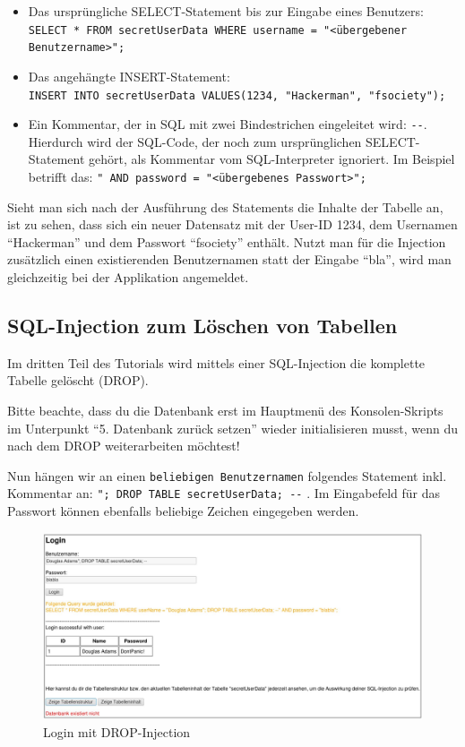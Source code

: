 \begin{itemize}
	\item Das ursprüngliche SELECT-Statement bis zur Eingabe eines Benutzers:  \colorbox{altgray}{\lstinline|SELECT * FROM secretUserData WHERE username = "<übergebener Benutzername>";|}
	\item Das angehängte INSERT-Statement:\\ \colorbox{altgray}{\lstinline|INSERT INTO secretUserData VALUES(1234, "Hackerman", "fsociety");|}
	\item Ein Kommentar, der in SQL mit zwei Bindestrichen eingeleitet wird: \colorbox{altgray}{\lstinline|--|}. Hierdurch wird der SQL-Code, der noch zum ursprünglichen SELECT-Statement gehört, als Kommentar vom SQL-Interpreter ignoriert. Im Beispiel betrifft das: \colorbox{altgray}{\lstinline|" AND password = "<übergebenes Passwort>";|}
\end{itemize}

Sieht man sich nach der Ausführung des Statements die Inhalte der Tabelle an, ist zu sehen, dass sich ein neuer Datensatz mit der User-ID 1234, dem Usernamen \enquote{Hackerman} und dem Passwort \enquote{fsociety} enthält. Nutzt man für die Injection zusätzlich einen existierenden Benutzernamen statt der Eingabe \enquote{bla}, wird man gleichzeitig bei der Applikation angemeldet.

\subsection{SQL-Injection zum Löschen von Tabellen}
Im dritten Teil des Tutorials wird mittels einer SQL-Injection die komplette Tabelle gelöscht (DROP).
 
Bitte beachte, dass du die Datenbank erst im Hauptmenü des Konsolen-Skripts im Unterpunkt \enquote{5. Datenbank zurück setzen} wieder initialisieren musst, wenn du nach dem DROP weiterarbeiten möchtest! 
 
Nun hängen wir an einen \colorbox{altgray}{\lstinline|beliebigen Benutzernamen|} folgendes Statement inkl. Kommentar an: \colorbox{altgray}{\lstinline|"; DROP TABLE secretUserData; --|} . Im Eingabefeld für das Passwort können ebenfalls beliebige Zeichen eingegeben werden.
 
\begin{figure}[H]
	\centering
	\includegraphics[width=\textwidth]{images/SQL_Injection/drop_injection.jpg}
	\caption{Login mit DROP-Injection}
	\label{fig:drop_injection}
\end{figure}

